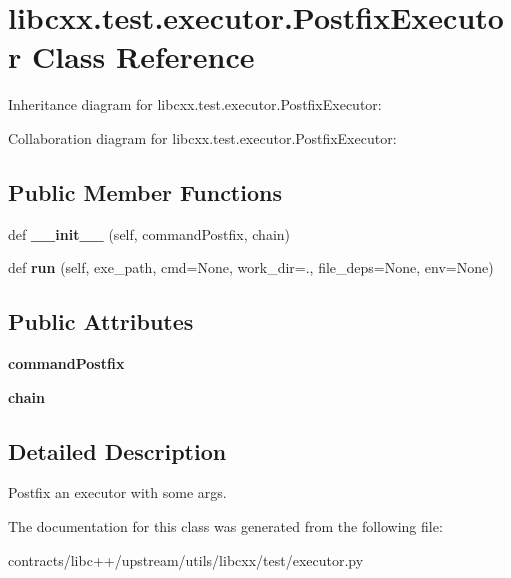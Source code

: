 \hypertarget{classlibcxx_1_1test_1_1executor_1_1_postfix_executor}{}\section{libcxx.\+test.\+executor.\+Postfix\+Executor Class Reference}
\label{classlibcxx_1_1test_1_1executor_1_1_postfix_executor}


Inheritance diagram for libcxx.\+test.\+executor.\+Postfix\+Executor\+:


Collaboration diagram for libcxx.\+test.\+executor.\+Postfix\+Executor\+:
\subsection*{Public Member Functions}
\begin{DoxyCompactItemize}
\item 
\mbox{\label{classlibcxx_1_1test_1_1executor_1_1_postfix_executor_a6272e1d3326f83fdf146c03856199448}} 
def {\bfseries \+\_\+\+\_\+init\+\_\+\+\_\+} (self, command\+Postfix, chain)
\item 
\mbox{\label{classlibcxx_1_1test_1_1executor_1_1_postfix_executor_a9eb5515bbf3dc617699e1d577bfce6aa}} 
def {\bfseries run} (self, exe\+\_\+path, cmd=None, work\+\_\+dir=\textquotesingle{}.\textquotesingle{}, file\+\_\+deps=None, env=None)
\end{DoxyCompactItemize}
\subsection*{Public Attributes}
\begin{DoxyCompactItemize}
\item 
\mbox{\label{classlibcxx_1_1test_1_1executor_1_1_postfix_executor_ac636199b0f3494a18e72c423b1a5a217}} 
{\bfseries command\+Postfix}
\item 
\mbox{\label{classlibcxx_1_1test_1_1executor_1_1_postfix_executor_a1d10f35e202e6a3b47149f99326c4856}} 
{\bfseries chain}
\end{DoxyCompactItemize}


\subsection{Detailed Description}
\begin{DoxyVerb}Postfix an executor with some args.\end{DoxyVerb}
 

The documentation for this class was generated from the following file\+:\begin{DoxyCompactItemize}
\item 
contracts/libc++/upstream/utils/libcxx/test/executor.\+py\end{DoxyCompactItemize}
